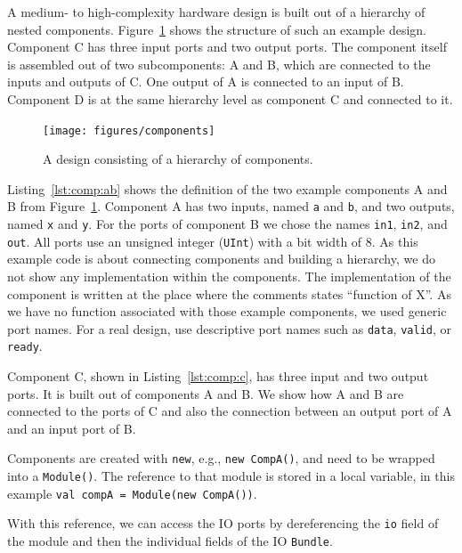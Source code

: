 \documentclass[%
    10pt,
    headinclude, footexclude,
    openright, %
    notitlepage,
    cleardoubleempty,
    headsepline,
    pointlessnumbers,
    bibtotoc, idxtotoc,
    ]{scrbook}
\newcommand{\code}[1]{{\lstinline[basicstyle=\small\ttfamily]{#1}}}
\begin{document}
A medium- to high-complexity hardware design is built out of a hierarchy of
nested components.
Figure~\ref{fig:components} shows the structure of such an example design. Component C has
three input ports and two output ports. The component itself is assembled out
of two subcomponents: A and B, which are connected to the inputs and
outputs of C. One output of A is connected to an input of B.
Component D is at the same hierarchy level as component C and connected
to it.

\begin{figure}
  \centering
  \texttt{[image: figures/components]}
  \caption{A design consisting of a hierarchy of components.}
  \label{fig:components}
\end{figure}


Listing~\ref{lst:comp:ab} shows the definition of the two example components A and B from
Figure~\ref{fig:components}.
Component A has two inputs, named \code{a} and \code{b}, and two
outputs, named \code{x} and \code{y}. For the ports of component B
we chose the names \code{in1}, \code{in2}, and \code{out}.
All ports use an unsigned integer (\code{UInt}) with a bit width of 8.
As this example code is about connecting components and building a
hierarchy, we do not show any implementation within the components.
The implementation of the component is written at the place where
the comments states ``function of X''.
As we have no function associated with those example components,
we used generic port names. For a real design, use descriptive
port names such as \code{data}, \code{valid}, or \code{ready}.

Component C, shown in Listing~\ref{lst:comp:c}, has three input and two output ports. It is built out of
components A and B. We show how A and B are connected to the ports
of C and also the connection between an output port of A and an
input port of B.


Components are created with \code{new}, e.g., \code{new CompA()}, and need to be wrapped
into a \code{Module()}. The reference to that module is stored in a local variable,
in this example \code{val compA = Module(new CompA())}.

With this reference, we can access the IO ports by dereferencing the \code{io} field of the module
and then the individual fields of the IO \code{Bundle}.
\end{document}
